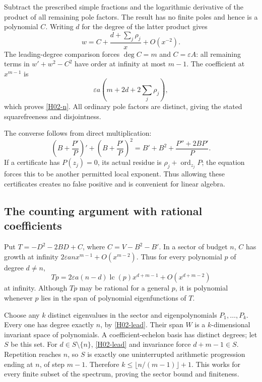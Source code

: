 \documentclass[11pt,a4paper]{article}
\theoremstyle{definition}\newtheorem{definition}[theorem]{Definition}
\theoremstyle{remark}\newtheorem{remark}[theorem]{Remark}
\numberwithin{equation}{section}
\begin{document}
Subtract the prescribed simple fractions and the logarithmic derivative of the product of all remaining pole factors. The result has no finite poles and hence is a polynomial $C$. Writing $d$ for the degree of the latter product gives
\[w=C+\frac{d+\sum_j\rho_j}{x}+O(x^{-2}).\]
The leading-degree comparison forces $\deg C=m$ and $C=\varepsilon A$: all remaining terms in $w'+w^2-C^2$ have order at infinity at most $m-1$. The coefficient at $x^{m-1}$ is
\[\varepsilon a\left(m+2d+2\sum_j\rho_j\right),\]
which proves \eqref{H02-n}. All ordinary pole factors are distinct, giving the stated squarefreeness and disjointness.

The converse follows from direct multiplication:
\[\left(B+\frac{P'}P\right)'+\left(B+\frac{P'}P\right)^2
=B'+B^2+\frac{P''+2BP'}P.\]
If a certificate has $P(z_j)=0$, its actual residue is $\rho_j+\operatorname{ord}_{z_j}P$; the equation forces this to be another permitted local exponent. Thus allowing these certificates creates no false positive and is convenient for linear algebra.
\subsection{The counting argument with rational coefficients}\label{H02-sec-3}
Put $T=-D^2-2BD+C$, where $C=V-B^2-B'$. In a sector of budget $n$, $C$ has growth at infinity $2\varepsilon a n x^{m-1}+O(x^{m-2})$. Thus for every polynomial $p$ of degree $d\ne n$,
\begin{equation}\label{H02-lead}
Tp=2\varepsilon a(n-d)\operatorname{lc}(p)x^{d+m-1}
+O(x^{d+m-2})
\end{equation}
at infinity. Although $Tp$ may be rational for a general $p$, it is polynomial whenever $p$ lies in the span of polynomial eigenfunctions of $T$.

Choose any $k$ distinct eigenvalues in the sector and eigenpolynomials $P_1,\ldots,P_k$. Every one has degree exactly $n$, by \eqref{H02-lead}. Their span $W$ is a $k$-dimensional invariant space of polynomials. A coefficient-echelon basis has distinct degrees; let $S$ be this set. For $d\in S\setminus\{n\}$, \eqref{H02-lead} and invariance force $d+m-1\in S$. Repetition reaches $n$, so $S$ is exactly one uninterrupted arithmetic progression ending at $n$, of step $m-1$. Therefore $k\le\lfloor n/(m-1)\rfloor+1$. This works for every finite subset of the spectrum, proving the sector bound and finiteness.
\end{document}
